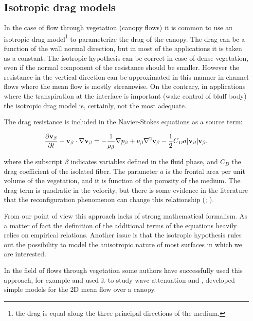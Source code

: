 \subsection{Isotropic drag models}
\label{sec:canopy_eq}

In the case of flow through vegetation (canopy flows) it is common to use an isotropic drag model\footnote{the drag is equal along the three principal directions of the medium.} to parameterize the drag of the canopy.
The drag can be a function of the wall normal direction, but in most of the applications it is taken as a constant.
The isotropic hypothesis can be correct in case of dense vegetation, even if the normal component of the resistance should be smaller.
However the resistance in the vertical direction can be approximated in this manner in channel flows where the mean flow is mostly streamwise. On the contrary, in applications where the transpiration at the interface is important (wake control of bluff body) the isotropic drag model is, certainly, not the most adequate.

The drag resistance is included in the Navier-Stokes equations as a source term:

\begin{equation}
\dfrac{\partial \textbf{v}_{\beta}}{\partial t} + \textbf{v}_{\beta} \cdot \nabla \textbf{v}_{\beta} = -\frac{1}{\rho_{\beta}} \nabla p_{\beta} + \nu_{\beta} \nabla^2 \textbf{v}_{\beta} - \dfrac{1}{2} C_D a |\textbf{v}_{\beta}| \textbf{v}_{\beta}, 
\label{eq:mom_cd}
\end{equation}

where the subscript $\beta$ indicates variables defined in the fluid phase, and $C_D$ the drag coefficient of the isolated fiber.
The parameter $a$ is the frontal area per unit volume of the vegetation, and it is function of the porosity of the medium.
The drag term is quadratic in the velocity, but there is some evidence in the literature that the reconfiguration phenomenon can change this relationship (\citet{gosselin2011drag}; \citet{alvarado2017nature}).

From our point of view this approach lacks of strong mathematical formalism. As a matter of fact the definition of the additional terms of the equations heavily relies on empirical relations.
Another issue is that the isotropic hypothesis rules out the possibility to model the anisotropic nature of most surfaces in which we are interested. %

In the field of flows through vegetation some authors have successfully used this approach, for example \citet{maza2013coupled} and \citet{maza2015tsunami} used it to study wave attenuation and \citet{ghisalberti2004limited}, \citet{battiato2014single} developed simple models for the 2D mean flow over a canopy.


